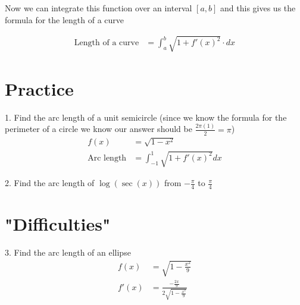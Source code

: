 \documentclass[12pt, letterpaper]{article}
\begin{document}
Now we can integrate this function over an interval $[a, b]$ and this gives us the formula for the length of a curve

\begin{align}
    \text{Length of a curve} &= \int_{a}^{b} \sqrt{1 + f'(x)^2} \cdot dx
\end{align}

\section{Practice}
1. Find the arc length of a unit semicircle (since we know the formula for the perimeter of a circle we know our answer should be $\frac{2\pi (1)}{2} = \pi$)
\begin{align}
    f(x) &= \sqrt{1-x^2} \\
    \text{Arc length} &= \int_{-1}^{1} \sqrt{1 + f'(x)^2} dx 
\end{align}

\begin{center}
\end{center}

\vspace{0.5cm}

2. Find the arc length of $\log(\sec(x))$ from $-\frac{\pi}{4}$ to $\frac{\pi}{4}$

\section{"Difficulties"}
3. Find the arc length of an ellipse
\begin{align}
    f(x) &= \sqrt{1-\frac{x^2}{9}} \\
    f'(x) &= \frac{-\frac{2x}{9}}{2\sqrt{1-\frac{x^2}{9}}}
\end{align}

\begin{center}
    \end{center}
\end{document}
